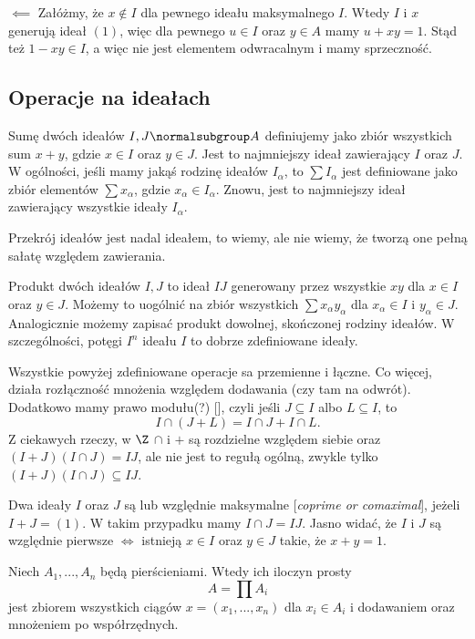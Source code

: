 $\impliedby$ Załóżmy, że $x\notin I$ dla pewnego ideału maksymalnego $I$. Wtedy $I$ i $x$ generują ideał $(1)$, więc dla pewnego $u\in I$ oraz $y\in A$ mamy $u+xy=1$. Stąd też $1-xy\in I$, a więc nie jest elementem odwracalnym i mamy sprzeczność.

\proofend

\subsection{Operacje na ideałach}

Sumę dwóch ideałów $I,J\normalsubgroup A$ definiujemy jako zbiór wszystkich sum $x+y$, gdzie $x\in I$ oraz $y\in J$. Jest to najmniejszy ideał zawierający $I$ oraz $J$. W ogólności, jeśli mamy jakąś rodzinę ideałów $I_\alpha$, to $\sum I_\alpha$ jest definiowane jako zbiór elementów $\sum x_\alpha$, gdzie $x_\alpha\in I_\alpha$. Znowu, jest to najmniejszy ideał zawierający wszystkie ideały $I_\alpha$.

Przekrój ideałów jest nadal ideałem, to wiemy, ale nie wiemy, że tworzą one pełną sałatę względem zawierania.

Produkt dwóch ideałów $I, J$ to ideał $IJ$ generowany przez wszystkie $xy$ dla $x\in I$ oraz $y\in J$. Możemy to uogólnić na zbiór wszystkich $\sum x_\alpha y_\alpha$ dla $x_\alpha\in I$ i $y_\alpha\in J$. Analogicznie możemy zapisać produkt dowolnej, skończonej rodziny ideałów. W szczególności, potęgi $I^n$ ideału $I$ to dobrze zdefiniowane ideały. 

Wszystkie powyżej zdefiniowane operacje sa przemienne i łączne. Co więcej, działa rozłączność mnożenia względem dodawania (czy tam na odwrót). Dodatkowo mamy prawo modułu(?) [], czyli jeśli $J\subseteq I$ albo $L\subseteq I$, to
$$I\cap(J+L)=I\cap J+I\cap L.$$
Z ciekawych rzeczy, w $\Z$ $\cap$ i $+$ są rozdzielne względem siebie oraz $(I+J)(I\cap J)=IJ$, ale nie jest to regułą ogólną, zwykle tylko $(I+J)(I\cap J)\subseteq IJ$.

Dwa ideały $I$ oraz $J$ są  lub względnie maksymalne [\emph{coprime or comaximal}], jeżeli $I+J=(1)$. W takim przypadku mamy $I\cap J=IJ$. Jasno widać, że $I$ i $J$ są względnie pierwsze $\iff$ istnieją $x\in I$ oraz $y\in J$ takie, że $x+y=1$.
\smallskip

Niech $A_1,...,A_n$ będą pierścieniami. Wtedy ich iloczyn prosty 
$$A=\prod A_i$$
jest zbiorem wszystkich ciągów $x=(x_1,...,x_n)$ dla $x_i\in A_i$ i dodawaniem oraz mnożeniem po współrzędnych.

